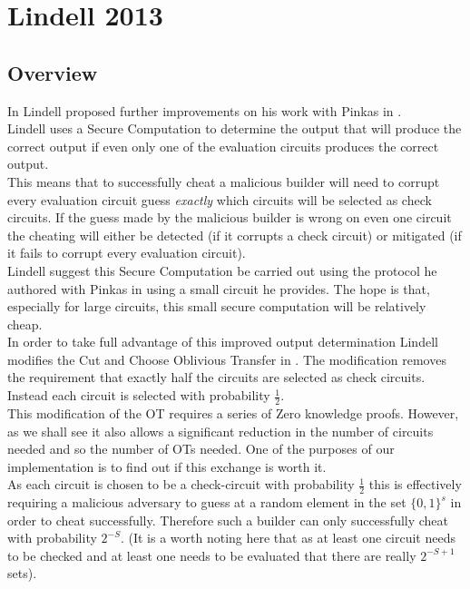 \documentclass[ %
                    author={Nicholas Tutte},
                supervisor={Prof. Nigel Smart},
                    degree={MEng},
                     title={Secure Two Party Computation},
                  subtitle={A practical comparison of recent protocols},
                      type={Research - GG1K},
                      year={2015} ]{dissertation}
\begin{document}
		\section{Lindell 2013}
			\subsection{Overview}

				In \cite{Lindell_CnC_2013} Lindell proposed further improvements on his work with Pinkas in \cite{LindellAndPinkas2011}.\\

				Lindell uses a Secure Computation to determine the output that will produce the correct output if even only one of the evaluation circuits produces the correct output.\\

				This means that to successfully cheat a malicious builder will need to corrupt every evaluation circuit guess \emph{exactly} which circuits will be selected as check circuits. If the guess made by the malicious builder is wrong on even one circuit the cheating will either be detected (if it corrupts a check circuit) or mitigated (if it fails to corrupt every evaluation circuit).\\

				Lindell suggest this Secure Computation be carried out using the protocol he authored with Pinkas in \cite{LindellAndPinkas2011} using a small circuit he provides. The hope is that, especially for large circuits, this small secure computation will be relatively cheap.\\

				In order to take full advantage of this improved output determination Lindell modifies the Cut and Choose Oblivious Transfer in \cite{LindellAndPinkas2011}. The modification removes the requirement that exactly half the circuits are selected as check circuits. Instead each circuit is selected with probability $\frac{1}{2}$.\\

				This modification of the OT requires a series of Zero knowledge proofs. However, as we shall see it also allows a significant reduction in the number of circuits needed and so the number of OTs needed. One of the purposes of our implementation is to find out if this exchange is worth it.\\

				As each circuit is chosen to be a check-circuit with probability $\frac{1}{2}$ this is effectively requiring a malicious adversary to guess at a random element in the set $\{0, 1\}^s$ in order to cheat successfully. Therefore such a builder can only successfully cheat with probability $2^{-S}$. (It is a worth noting here that as at least one circuit needs to be checked and at least one needs to be evaluated that there are really $2^{-S+1}$ sets).
\end{document}
